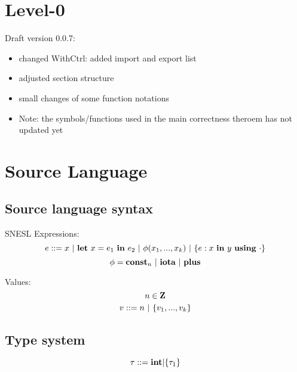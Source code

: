 \def\sfun#1#2{(#1,#2)}

\def\Trans#1#2#3#4#5{#1 \Env #2 \=>{#3}{#4} #5}
\def\Transf#1#2#3#4#5{#1(#2) \=>{#3}{#4} #5}
 
 
\def\S{\mathbf{S}}
\def\Sin{\mathbf{S}_{in}}
\def\Sout{\mathbf{S}_{out}}
\def\FV#1#2{\mathtt{fv}(#1,#2)}



\newcommand{\eq}[2]{\begin{equation}\label{#1} #2\end{equation}}

\providecommand{\versionnumber}{0.0.7}


\section{Level-0}

Draft version \versionnumber: 
\begin{itemize}
	\item changed WithCtrl: added import and export list 
	\item adjusted section structure
    \item small changes of some function notations
	\item Note: the symbols/functions used in the main correctness theroem has not updated yet
\end{itemize}

\section{Source Language}

\subsection{Source language syntax}
SNESL Expressions:
$$e ::= x \ | \ \Let{x}{e_1}{e_2} \ | \ \hcall{\Tupk{x}} \ | \ \Comp{e}{x}{y}{\cdot} $$
$$\phi = \mathbf{const}_n \ | \ \mathbf{iota} \ | \ \mathbf{plus} $$ 

Values: \\
$$ n \in \mathbf{Z} $$
$$ v::= n \ | \ \{ v_1,...,v_k \}$$

\subsection{Type system}
$$\tau ::= \mathbf{int} | \{\tau_1\}$$

